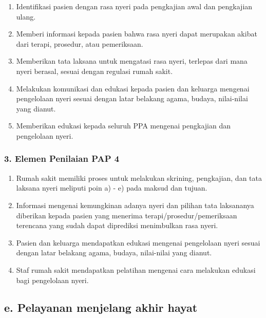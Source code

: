 \documentclass[
]{book}
\providecommand{\tightlist}{%
  \setlength{\itemsep}{0pt}\setlength{\parskip}{0pt}}
\begin{document}
\begin{enumerate}
\def\labelenumi{\alph{enumi}.}
\tightlist
\item
  Identifikasi pasien dengan rasa nyeri pada pengkajian awal dan pengkajian ulang.
\item
  Memberi informasi kepada pasien bahwa rasa nyeri dapat merupakan akibat dari terapi, prosedur, atau pemeriksaan.
\item
  Memberikan tata laksana untuk mengatasi rasa nyeri, terlepas dari mana nyeri berasal, sesuai dengan regulasi rumah sakit.
\item
  Melakukan komunikasi dan edukasi kepada pasien dan keluarga mengenai pengelolaan nyeri sesuai dengan latar belakang agama, budaya, nilai-nilai yang dianut.
\item
  Memberikan edukasi kepada seluruh PPA mengenai pengkajian dan pengelolaan nyeri.
\end{enumerate}

\hypertarget{elemen-penilaian-pap-4}{%
\subsubsection*{3. Elemen Penilaian PAP 4}\label{elemen-penilaian-pap-4}}

\begin{enumerate}
\def\labelenumi{\alph{enumi}.}
\tightlist
\item
  Rumah sakit memiliki proses untuk melakukan skrining, pengkajian, dan tata laksana nyeri meliputi poin a) - e) pada maksud dan tujuan.
\item
  Informasi mengenai kemungkinan adanya nyeri dan pilihan tata laksananya diberikan kepada pasien yang menerima terapi/prosedur/pemeriksaan terencana yang sudah dapat diprediksi menimbulkan rasa nyeri.
\item
  Pasien dan keluarga mendapatkan edukasi mengenai pengelolaan nyeri sesuai dengan latar belakang agama, budaya, nilai-nilai yang dianut.
\item
  Staf rumah sakit mendapatkan pelatihan mengenai cara melakukan edukasi bagi pengelolaan nyeri.
\end{enumerate}

\hypertarget{e.-pelayanan-menjelang-akhir-hayat}{%
\subsection*{e. Pelayanan menjelang akhir hayat}\label{e.-pelayanan-menjelang-akhir-hayat}}
\end{document}
